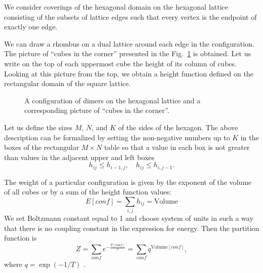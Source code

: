 \documentclass{article}
\begin{document}
We consider coverings of the hexagonal domain on the hexagonal lattice consisting of the subsets of
lattice edges such that every vertex is the endpoint of exactly one edge.

We can draw a rhombus on a dual lattice around each edge in the configuration. The picture of
``cubes in the corner'' presented in the Fig.~\ref{dhf} is obtained. Let us write on the top of each
uppermost cube the height of its column of cubes. Looking at this picture from the top, we obtain a
height function defined on the rectangular domain of the square lattice. 

\begin{figure}[htbp]
\caption{\label{dhf}A configuration of dimers on the hexagonal lattice and a corresponding picture
  of ``cubes in the corner''.}
\end{figure}

Let us define the sizes $M$, $N$, and $K$ of the sides of the hexagon.
The above description can be formalized by
setting the non-negative numbers up to $K$ in the boxes of the rectangular $M\times N$ table so that a value in
each box is not greater than values in the adjacent upper and left boxes
\begin{equation}
  \label{eq:1}
  h_{ij}\leq h_{i-1,j},\quad h_{ij}\leq h_{i,j-1}.
\end{equation}

The weight of a particular configuration is given by the exponent of the volume of all cubes or by a
sum of the height function values:
\begin{equation*}
  \label{eq:10}
  E[conf]=\sum_{i,j} h_{ij}=\mathrm{Volume}
\end{equation*}
We set Boltzmann constant equal to 1 and choose system of units in such a way that there is no
coupling constant in the expression for energy. Then the partition function is
\begin{equation*}
  \label{eq:14}
  Z=\sum_{conf} e^{-\frac{E[conf]}{T}}=\sum_{conf}q^{\mathrm{Volume}[conf]}, 
\end{equation*}
where $q=\exp\left(-1/T\right)$ .
\end{document}
